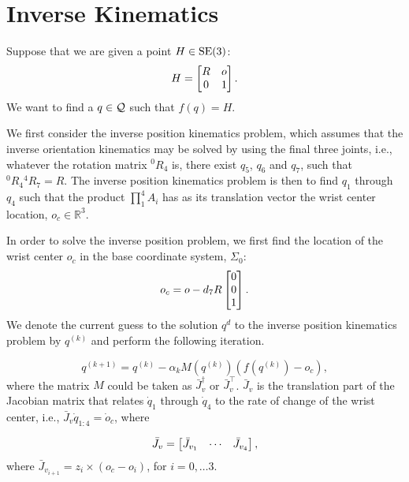 \section{Inverse Kinematics}
\label{sec:inversekin}

Suppose that we are given a point $H \in \mathrm{SE}(3)$: 
\[ H = \begin{bmatrix}R & o \\ 0 & 1\end{bmatrix}. \]
We want to find a $q \in \mathcal{Q}$ such that $f(q) = H$.

We first consider the inverse position kinematics problem, 
which assumes that the inverse orientation kinematics may be 
solved by using the final three joints, i.e., whatever the 
rotation matrix $^0R_4$ is, there exist $q_5$, $q_6$ and $q_7$, 
such that ${}^0R_4 {}^4R_7 = R$. The inverse position kinematics 
problem is then to find $q_1$ through $q_4$ such that the product $\prod_1^4
A_i$ has as its translation vector the wrist center location, $o_c \in
\mathbb{R}^3$.

In order to solve the inverse position problem, we first find the location of
the wrist center $o_c$ in the base coordinate system,
$\Sigma_0$: \[ o_c = o - d_7 R \begin{bmatrix}0 \\ 0 \\ 1\end{bmatrix}. \]
%
We denote the current guess to the solution $q^d$ to the inverse position
kinematics problem by $q^{(k)}$ and perform the following iteration.

\begin{equation}
  q^{(k+1)} = q^{(k)} - \alpha_k M\left(q^{(k)}\right)\left(f\left(q^{(k)}\right) - o_c \right),
  \label{eq:ipk_iter}
\end{equation}
%
where the matrix $M$ could be taken as $\bar{J}_v^\dagger$ or $\bar{J}_v^\top$. 
$\bar{J}_v$ is the translation part of the Jacobian matrix that relates
$\dot{q}_1$ through $\dot{q}_4$ to the rate of change of the wrist center, i.e., 
$\bar{J}_v \dot{q}_{1:4} = \dot{o}_c$, where

\[ \bar{J}_v = \begin{bmatrix}\bar{J}_{v_1} & \cdots & \bar{J}_{v_4}\end{bmatrix}, \]
where $\bar{J}_{v_{i+1}} = z_i \times (o_c - o_i)$, for $i = 0, \ldots 3$.

